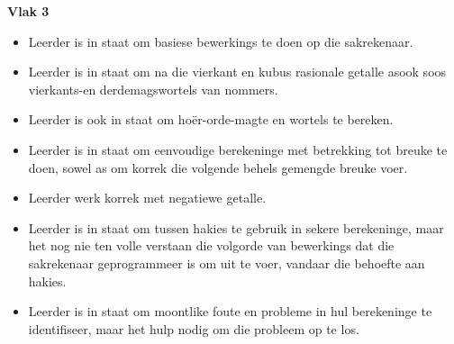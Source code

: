 \textbf{Vlak 3}\begin{itemize}[noitemsep]
\item
Leerder is in staat om basiese bewerkings te doen op die sakrekenaar.
\item
Leerder is in staat om na die vierkant en kubus rasionale getalle
asook soos vierkants-en derdemagswortels van nommers.
\item
Leerder is ook in staat om ho\"{e}r-orde-magte en wortels te bereken.
\item
Leerder is in staat om eenvoudige berekeninge met betrekking tot
breuke te doen, sowel as om korrek die volgende behels gemengde breuke
voer.
\item
Leerder werk korrek met negatiewe getalle.
\item
Leerder is in staat om tussen hakies te gebruik in sekere berekeninge,
maar het nog nie ten volle verstaan ​​die volgorde van bewerkings dat
die sakrekenaar geprogrammeer is om uit te voer, vandaar die behoefte
aan hakies.
\item
Leerder is in staat om moontlike foute en probleme in hul berekeninge
te identifiseer, maar het hulp nodig om die probleem op te los.
\end{itemize}
